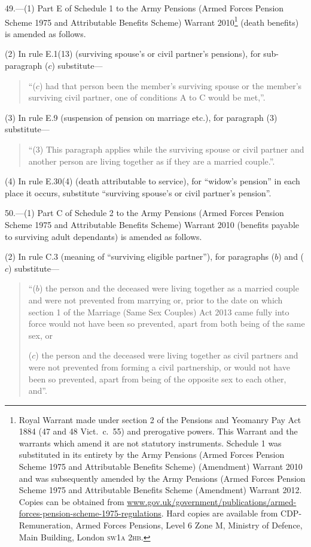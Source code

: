 \documentclass[12pt,a4paper]{article}
\begin{document}
49.—(1) Part E of Schedule 1 to the Army Pensions (Armed Forces Pension Scheme 1975 and Attributable Benefits Scheme) Warrant 2010\footnote{Royal Warrant made under section 2 of the Pensions and Yeomanry Pay Act 1884 (47 and 48 Vict.\ c.~55) and prerogative powers. This Warrant and the warrants which amend it are not statutory instruments. Schedule 1 was substituted in its entirety by the Army Pensions (Armed Forces Pension Scheme 1975 and Attributable Benefits Scheme) (Amendment) Warrant 2010 and was subsequently amended by the Army Pensions (Armed Forces Pension Scheme 1975 and Attributable Benefits Scheme (Amendment) Warrant 2012. Copies can be obtained from \href{http://www.gov.uk/government/publications/armed-forces-pension-scheme-1975-regulations}{www.gov.uk/\hspace{0pt}government/\hspace{0pt}publications/\hspace{0pt}armed-forces-\mbox{pension}-scheme-1975-regulations}. Hard copies are available from CDP-Remuneration, Armed Forces Pensions, Level 6 Zone M, Ministry of Defence, Main Building, London \textsc{\lowercase{SW1A 2HB}}.} (death benefits) is amended as follows.

(2) In rule E.1(13) (surviving spouse’s or civil partner’s pensions), for sub-paragraph ($c$)  substitute—
\begin{quotation}
“($c$) had that person been the member’s surviving spouse or the member’s surviving civil partner, one of conditions A to C would be met,”.
\end{quotation}

(3) In rule E.9 (suspension of pension on marriage etc.), for paragraph (3) substitute—
\begin{quotation}
“(3) This paragraph applies while the surviving spouse or civil partner and another person are living together as if they are a married couple.”.
\end{quotation}

(4) In rule E.30(4) (death attributable to service), for “widow’s pension” in each place it occurs, substitute “surviving spouse’s or civil partner’s pension”.

\medskip

50.—(1) Part C of Schedule 2 to the Army Pensions (Armed Forces Pension Scheme 1975 and Attributable Benefits Scheme) Warrant 2010 (benefits payable to surviving adult dependants) is amended as follows.

(2) In rule C.3 (meaning of “surviving eligible partner”), for paragraphs ($b$)  and ($c$)  substitute—
\begin{quotation}
“($b$) the person and the deceased were living together as a married couple and were not prevented from marrying or, prior to the date on which section 1 of the Marriage (Same Sex Couples) Act 2013 came fully into force would not have been so prevented, apart from both being of the same sex, or

($c$) the person and the deceased were living together as civil partners and were not prevented from forming a civil partnership, or would not have been so prevented, apart from being of the opposite sex to each other, and”.
\end{quotation}
\end{document}
